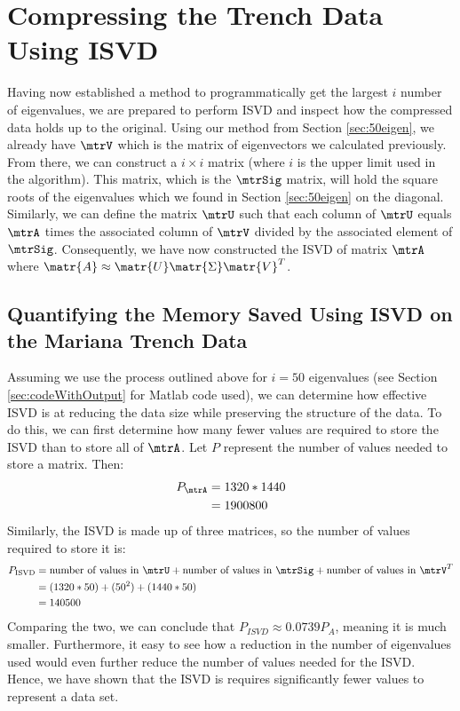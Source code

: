 
\section{Compressing the Trench Data Using ISVD} \label{sec:allTogetherNow}
Having now established a method to programmatically get the largest $i$ number of
eigenvalues, we are prepared to perform ISVD and inspect how the compressed data holds up to the original.
Using our method from Section \ref{sec:50eigen}, we already have $\mtrV$ which is the matrix of eigenvectors
we calculated previously. From there, we can construct a $i \times i$ matrix (where $i$ is the upper limit used in the algorithm). This matrix, which is the $\mtrSig$ matrix, will hold the square roots of the eigenvalues which we found in Section \ref{sec:50eigen} on the diagonal. Similarly, we can define the matrix $\mtrU$
such that each column of $\mtrU$ equals $\mtrA$ times the associated column of $\mtrV$ divided by the associated element of $\mtrSig$. Consequently, we have now constructed the ISVD of matrix $\mtrA$ where $\matr{A} \approx \matr{U}\matr{\Sigma}\matr{V}^T$.

\subsection{Quantifying the Memory Saved Using ISVD on the Mariana Trench Data} \label{sec:memoryISVD}
Assuming we use the process outlined above for $i=50$ eigenvalues (see Section \ref{sec:codeWithOutput} for Matlab code used), we can determine how effective ISVD is at reducing the data size while preserving the structure of the data. To do this, we can first determine how many fewer values are required to store the ISVD than to store all of $\mtrA$. Let $P$ represent  the number of values needed to store a matrix. Then:
\begin{align*}
    P_{\mtrA} &= 1320 * 1440\\
     &= 1900800 
\end{align*}
Similarly, the ISVD is made up of three matrices, so the number of values required to store it is:
\begin{align*}
    P_{\text{ISVD}} &=  \text{number of values in $\mtrU$} + \text{number of values in $\mtrSig$} + \text{number of values in $\mtrV^T$} \\
                    &= (1320 * 50) + (50^2) + (1440*50) \\
       &= 140500
\end{align*}
Comparing the two, we can  conclude that $P_{ISVD} \approx 0.0739P_A$, meaning it is much smaller. Furthermore, it easy to see how a reduction in the number of eigenvalues used would even further reduce the number of values needed for the ISVD. Hence, we have shown that the ISVD is requires significantly fewer values to represent a data set. 

